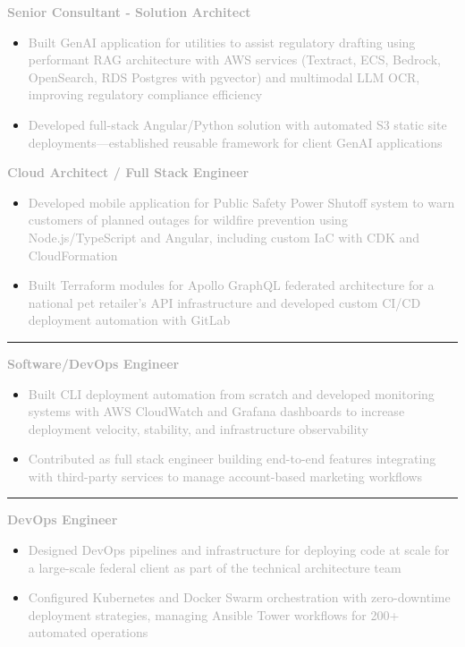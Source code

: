 \documentclass[10pt,letterpaper]{article}
\newcommand{\companyHeader}[2]{%
    \vspace{3pt}
    \noindent\textcolor{#2}{\rule{3pt}{10pt}}\hspace{6pt}{\headingfont\normalsize\textbf{\textcolor{darkgray}{#1}}}
    \vspace{1pt}
}
\newcommand{\positionHeader}[2]{%
    \noindent\textbf{\textcolor{darkgray}{#2}}\hspace{4pt}{\footnotesize\textcolor{mediumgray}{//}}\hspace{4pt}{\footnotesize\itshape\textcolor{mediumgray}{#1}}
    \vspace{1pt}
}
\begin{document}
\begin{minipage}[t][10.5in][t]{5.3in}
\begin{minipage}{4.7in}
\positionHeader{2022 – 2023}{Senior Consultant - Solution Architect}
\begin{itemize}
    \setlength\itemsep{0.5pt}
    \item\small\textcolor{darkgray}{Built GenAI application for utilities to assist regulatory drafting using performant RAG architecture with AWS services (Textract, ECS, Bedrock, OpenSearch, RDS Postgres with pgvector) and multimodal LLM OCR, improving regulatory compliance efficiency}
    \item\small\textcolor{darkgray}{Developed full-stack Angular/Python solution with automated S3 static site deployments—established reusable framework for client GenAI applications}
\end{itemize}

\vspace{1pt}

\positionHeader{2022}{Cloud Architect / Full Stack Engineer}
\begin{itemize}
    \setlength\itemsep{0.5pt}
    \item\small\textcolor{darkgray}{Developed mobile application for Public Safety Power Shutoff system to warn customers of planned outages for wildfire prevention using Node.js/TypeScript and Angular, including custom IaC with CDK and CloudFormation}
    \item\small\textcolor{darkgray}{Built Terraform modules for Apollo GraphQL federated architecture for a national pet retailer's API infrastructure and developed custom CI/CD deployment automation with GitLab}
\end{itemize}

\companyHeader{Triblio}{company2}

\positionHeader{2021 – 2022}{Software/DevOps Engineer}
\begin{itemize}
    \setlength\itemsep{0.5pt}
    \item\small\textcolor{darkgray}{Built CLI deployment automation from scratch and developed monitoring systems with AWS CloudWatch and Grafana dashboards to increase deployment velocity, stability, and infrastructure observability}
    \item\small\textcolor{darkgray}{Contributed as full stack engineer building end-to-end features integrating with third-party services to manage account-based marketing workflows}
\end{itemize}

\companyHeader{Accenture Federal Services}{company3}

\positionHeader{2018 – 2021}{DevOps Engineer}
\begin{itemize}
    \setlength\itemsep{0.5pt}
    \item\small\textcolor{darkgray}{Designed DevOps pipelines and infrastructure for deploying code at scale for a large-scale federal client as part of the technical architecture team}
    \item\small\textcolor{darkgray}{Configured Kubernetes and Docker Swarm orchestration with zero-downtime deployment strategies, managing Ansible Tower workflows for 200+ automated operations}
\end{itemize}


\end{minipage}
\end{minipage}
\end{document}
